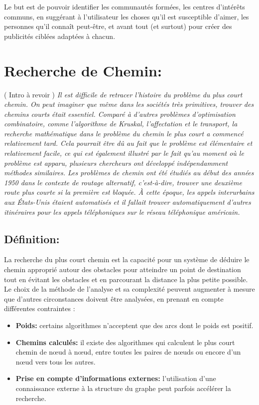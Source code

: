 Le but est de pouvoir identifier les communautés formées, les centres d'intérêts communs, en suggérant à l'utilisateur les choses qu'il est susceptible d'aimer, les personnes qu'il connaît peut-être, et avant tout (et surtout) pour créer des publicités ciblées adaptées à chacun.


\section{Recherche de Chemin:}
( Intro à revoir ) \newline
\emph{Il est difficile de retracer l'histoire du problème du plus court chemin. On peut imaginer que même dans les sociétés très primitives, trouver des chemins courts était essentiel. Comparé à d'autres problèmes d'optimisation combinatoire, comme l'algorithme de Kruskal, l'affectation et le transport, la recherche mathématique dans le problème du chemin le plus court a commencé relativement tard. Cela pourrait être dû au fait que le problème est élémentaire et relativement facile, ce qui est également illustré par le fait qu'au moment où le problème est apparu, plusieurs chercheurs ont développé indépendamment méthodes similaires.
Les problèmes de chemin ont été étudiés au début des années 1950 dans le contexte de \emph{routage alternatif}, c'est-à-dire, trouver une deuxième route plus courte si la première est bloquée. À cette époque, les appels interurbains aux États-Unis étaient automatisés et il fallait trouver automatiquement d'autres itinéraires pour les appels téléphoniques sur le réseau téléphonique américain.
}

\subsection{Définition:}
La recherche du plus court chemin est la capacité pour un système de déduire le chemin approprié autour des obstacles pour atteindre un point de destination tout en évitant les obstacles et en parcourant la distance la plus petite possible.
Le choix de la méthode de l'analyse et sa complexité peuvent augmenter à mesure que d'autres circonstances doivent être analysées, en prenant en compte différentes contraintes :

\begin{itemize}
	\item \textbf{Poids:} certains algorithmes n'acceptent que des arcs dont le poids est positif.
	\item \textbf{Chemins calculés:} il existe des algorithmes qui calculent le plus court chemin de nœud à nœud, entre toutes les paires de nœuds ou encore d'un nœud vers tous les autres.
	\item \textbf{Prise en compte d'informations externes:} l'utilisation d'une connaissance externe à la structure du graphe peut parfois accélérer la recherche.
\end{itemize}


